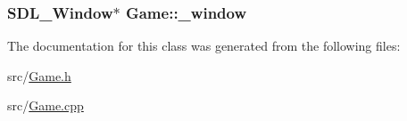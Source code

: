 \subsubsection[{\+\_\+window}]{\setlength{\rightskip}{0pt plus 5cm}S\+D\+L\+\_\+\+Window$\ast$ Game\+::\+\_\+window}\label{class_game_ac93b435b5da2f81e01da94a2871c1394}


The documentation for this class was generated from the following files\+:\begin{DoxyCompactItemize}
\item 
src/\hyperlink{_game_8h}{Game.\+h}\item 
src/\hyperlink{_game_8cpp}{Game.\+cpp}\end{DoxyCompactItemize}
